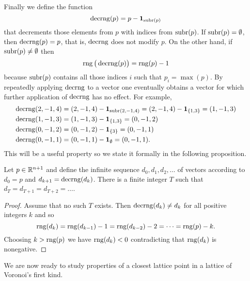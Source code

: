 \documentclass[final,leqno]{siamltex}
\begin{document}
Finally we define the function
\[
\operatorname{decrng}(p) = p -  \boldsymbol{1}_{\operatorname{subr}(p)}
\]
that decrements those elements from $p$ with indices from $\operatorname{subr}(p)$.  If $\operatorname{subr}(p) = \emptyset$, then $\operatorname{decrng}(p) = p$, that is, $\operatorname{decrng}$ does not modify $p$.  On the other hand, if $\operatorname{subr}(p) \neq \emptyset$ then
\[
\operatorname{rng}\big(\operatorname{decrng}(p)\big) = \operatorname{rng}(p) - 1
\]
because $\operatorname{subr}(p)$ contains all those indices $i$ such that $p_i = \max(p)$.  By repeatedly applying $\operatorname{decrng}$ to a vector one eventually obtains a vector for which further application of $\operatorname{decrng}$ has no effect.  For example,
\begin{align*}
\operatorname{decrng}(2,-1,4) &= (2,-1,4) - \boldsymbol{1}_{\operatorname{subr}(2,-1,4)} = (2,-1,4) - \boldsymbol{1}_{\{1,3\}} = (1,-1,3) \\ 
\operatorname{decrng}(1,-1,3) &= (1,-1,3) - \boldsymbol{1}_{\{1,3\}} = (0,-1,2) \\ 
\operatorname{decrng}(0,-1,2) &= (0,-1,2) - \boldsymbol{1}_{\{3\}} = (0,-1,1) \\ 
\operatorname{decrng}(0,-1,1) &= (0,-1,1) - \boldsymbol{1}_{\emptyset} = (0,-1,1).
\end{align*}
This will be a useful property so we state it formally in the following proposition.

\begin{proposition} \label{lem:repeatappdecrange} Let $p \in {\mathbb R}^{n+1}$ and define the infinite sequence $d_0,d_1,d_2,\dots$ of vectors according to $d_0=p$ and $d_{k+1} = \operatorname{decrng}(d_k)$.  There is a finite integer $T$ such that $d_T=d_{T+1}=d_{T+2}=\dots$.
\end{proposition}
\begin{proof}
Assume that no such $T$ exists.  Then $\operatorname{decrng}(d_k) \neq d_k$ for all positive integers $k$ and so 
\[
\operatorname{rng}(d_{k}) = \operatorname{rng}(d_{k-1}) - 1 = \operatorname{rng}(d_{k-2}) - 2 = \dots = \operatorname{rng}(p) - k.
\]  
Choosing $k > \operatorname{rng}(p)$ we have $\operatorname{rng}(d_{k}) < 0$ contradicting that $\operatorname{rng}(d_k)$ is nonegative.
\end{proof}

We are now ready to study properties of a closest lattice point in a lattice of Voronoi's first kind.
\end{document}

